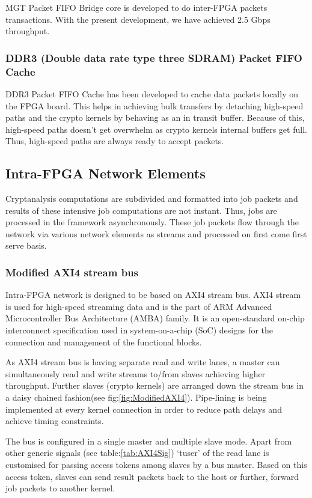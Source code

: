 \documentclass[10pt, conference, compsocconf]{IEEEtran}
\begin{document}
MGT Packet FIFO Bridge core is developed to do inter-FPGA packets transactions. With the present development, we have achieved 2.5 Gbps throughput.

\subsubsection{DDR3 (Double data rate type three SDRAM) Packet FIFO Cache}
DDR3 Packet FIFO Cache has been developed to cache data packets locally on the FPGA board. This helps in achieving bulk transfers by detaching high-speed paths and the crypto kernels by behaving as an in transit buffer. Because of this, high-speed paths doesn’t get overwhelm as crypto kernels internal buffers get full. Thus, high-speed paths are always ready to accept packets.

\subsection{Intra-FPGA Network Elements}
Cryptanalysis computations are subdivided and formatted into job packets and results of these intensive job computations are not instant. Thus, jobs are processed in the framework asynchronously. These job packets flow through the network via various network elements as streams and processed on first come first serve basis. 



\subsubsection{Modified AXI4 stream bus\cite{stevens2011introduction}}
Intra-FPGA network is designed to be based on AXI4 stream bus. AXI4 stream is used for high-speed streaming data and is the part of ARM Advanced Microcontroller Bus Architecture (AMBA) family. It is an open-standard on-chip interconnect specification used in system-on-a-chip (SoC) designs for the connection and management of the functional blocks.

As AXI4 stream bus is having separate read and write lanes, a master can simultaneously read and write streams to/from slaves achieving higher throughput. Further slaves (crypto kernels) are arranged down the stream bus in a daisy chained fashion(see fig:\ref{fig:ModifiedAXI4}). Pipe-lining is being implemented at every kernel connection in order to reduce path delays and achieve timing constraints. 

The bus is configured in a single master and multiple slave mode. Apart from other generic signals\cite{amba20104} (see table:\ref{tab:AXI4Sig}) `tuser' of the read lane is customised for passing access tokens among slaves by a bus master. Based on this access token, slaves can send result packets back to the host or further, forward job packets to another kernel.
\end{document}
